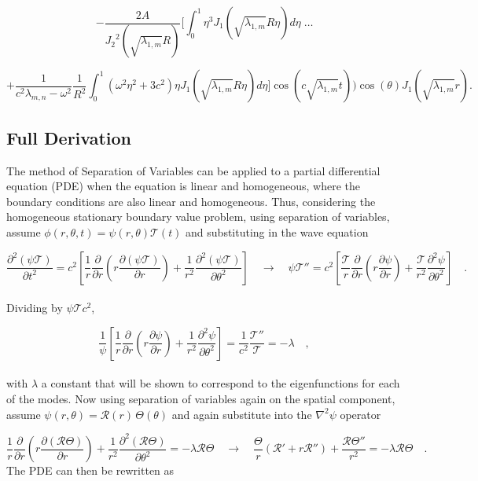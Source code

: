 \documentclass{homework}
\begin{document}
$$ - \frac{2A}{{J_2}^2 \left( \sqrt{\lambda_{1,m}} R \right)}\Bigg[ \int_0^1 \eta^3 J_1 \left( \sqrt{\lambda_{1,m}} R\eta \right) d\eta \; \dots $$

$$ + \frac{1}{c^2 \lambda_{m,n} - \omega^2} \frac{1}{R^2} \int_0^1 \left(\omega^2 \eta^2 + 3c^2 \right) \eta J_1 \left(\sqrt{\lambda_{1,m}} R \eta \right) d\eta \Bigg] \cos \left(c \sqrt{\lambda_{1,m}} t \right) \Biggl) \cos(\theta) J_1 \left(\sqrt{\lambda_{1,m} } r \right) .$$

\subsection{Full Derivation}
\noindent The method of Separation of Variables can be applied to a partial differential equation (PDE) when the equation is linear and homogeneous, where the boundary conditions are also linear and homogeneous. Thus, considering the homogeneous stationary boundary value problem, using separation of variables, assume $\phi(r, \theta, t) = \psi (r, \theta) \mathcal{T} (t)$ and substituting in the wave equation

\[ \frac{\partial^2 (\psi \mathcal{T})}{\partial t^2} = c^2 \left[ \frac{1}{r} \frac{\partial}{\partial r} \left(r \frac{\partial (\psi \mathcal{T})}{\partial r}\right) + \frac{1}{r^2} \frac{\partial^2 (\psi \mathcal{T})}{\partial \theta^2} \right] \quad \rightarrow \quad \psi \mathcal{T}'' = c^2 \left[ \frac{\mathcal{T}}{r} \frac{\partial}{\partial r} \left(r \frac{\partial \psi}{\partial r}\right) + \frac{\mathcal{T}}{r^2} \frac{\partial^2 \psi}{\partial \theta^2} \right] \quad .\]
\\ \noindent
Dividing by $\psi \mathcal{T} c^2$,

\[ \frac{1}{\psi} \left[ \frac{1}{r} \frac{\partial}{\partial r} \left(r \frac{\partial \psi}{\partial r}\right) + \frac{1}{r^2} \frac{\partial^2 \psi}{\partial \theta^2} \right] = \frac{1}{c^2} \frac{\mathcal{T}''}{\mathcal{T}} = - \lambda \quad ,\]
\\ \noindent
with $\lambda$ a constant that will be shown to correspond to the eigenfunctions for each of the modes. Now using separation of variables again on the spatial component, assume $ \psi (r, \theta) = \mathcal{R}(r) \, \Theta(\theta) $ and again substitute into the $\nabla^2 \psi$ operator

\[ \frac{1}{r} \frac{\partial}{\partial r} \left(r \frac{\partial (\mathcal{R} \Theta)}{\partial r}\right) + \frac{1}{r^2} \frac{\partial^2 (\mathcal{R} \Theta)}{\partial \theta^2} = - \lambda \mathcal{R} \Theta \quad \rightarrow \quad \frac{\Theta}{r} (\mathcal{R}' + r \mathcal{R}'') + \frac{\mathcal{R} \Theta''}{r^2} = - \lambda \mathcal{R} \Theta \quad .\]
\noindent
The PDE can then be rewritten as
\end{document}
